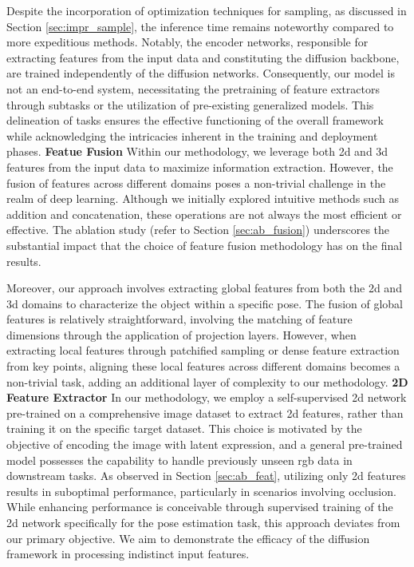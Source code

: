 \documentclass[12pt,DIV14,BCOR12mm,a4paper,footinclude=false,headinclude,parskip=half-,twoside,openright,cleardoublepage=empty,toc=index,bibliography=totoc,listof=totoc]{scrreprt}
\numberwithin{equation}{chapter}
\begin{document}
Despite the incorporation of optimization techniques for sampling, as discussed in Section \ref{sec:impr_sample}, the inference time remains noteworthy compared to more expeditious methods. Notably, the encoder networks, responsible for extracting features from the input data and constituting the diffusion backbone, are trained independently of the diffusion networks. Consequently, our model is not an end-to-end system, necessitating the pretraining of feature extractors through subtasks or the utilization of pre-existing generalized models. This delineation of tasks ensures the effective functioning of the overall framework while acknowledging the intricacies inherent in the training and deployment phases.
\bigbreak
\textbf{Featue Fusion} \quad Within our methodology, we leverage both \gls{2d} and \gls{3d} features from the input data to maximize information extraction. However, the fusion of features across different domains poses a non-trivial challenge in the realm of deep learning. Although we initially explored intuitive methods such as addition and concatenation, these operations are not always the most efficient or effective. The ablation study (refer to Section \ref{sec:ab_fusion}) underscores the substantial impact that the choice of feature fusion methodology has on the final results.

Moreover, our approach involves extracting global features from both the \gls{2d} and \gls{3d} domains to characterize the object within a specific pose. The fusion of global features is relatively straightforward, involving the matching of feature dimensions through the application of projection layers. However, when extracting local features through patchified sampling or dense feature extraction from key points, aligning these local features across different domains becomes a non-trivial task, adding an additional layer of complexity to our methodology.
\bigbreak
\textbf{2D Feature Extractor} \quad In our methodology, we employ a self-supervised \gls{2d} network pre-trained on a comprehensive image dataset to extract \gls{2d} features, rather than training it on the specific target dataset. This choice is motivated by the objective of encoding the image with latent expression, and a general pre-trained model possesses the capability to handle previously unseen \gls{rgb} data in downstream tasks. As observed in Section \ref{sec:ab_feat}, utilizing only \gls{2d} features results in suboptimal performance, particularly in scenarios involving occlusion. While enhancing performance is conceivable through supervised training of the \gls{2d} network specifically for the pose estimation task, this approach deviates from our primary objective. We aim to demonstrate the efficacy of the diffusion framework in processing indistinct input features.
\end{document}
